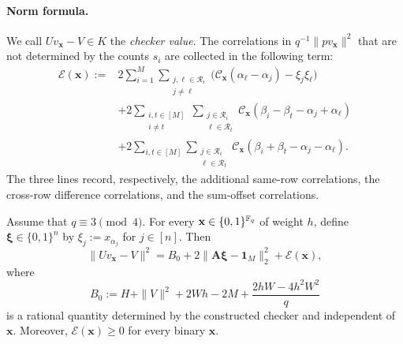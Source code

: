 \paragraph{Norm formula.}
We call $Uv_{\mathbf x}-V\in K$ the \emph{checker value}.  The
correlations in $q^{-1}\|pv_{\mathbf x}\|^2$ that are not determined by the
counts $s_i$ are collected in the following term:
\begin{equation}
\label{eq:checker-additional-correlations}
 \begin{aligned}
  \mathcal E(\mathbf x)
  :={}&
  2\sum_{i=1}^M
   \sum_{\substack{j,\ell\in\mathcal R_i\\j\ne\ell}}
  \bigl(
   \mathcal{C}_{\mathbf x}(\alpha_\ell-\alpha_j)-\xi_j\xi_\ell
  \bigr)
  \\
  &+2\sum_{\substack{i,t\in[M]\\i\ne t}}
   \sum_{\substack{j\in\mathcal R_i\\\ell\in\mathcal R_t}}
   \mathcal{C}_{\mathbf x}
   (\beta_i-\beta_t-\alpha_j+\alpha_\ell)
  \\
  &+2\sum_{i,t\in[M]}
   \sum_{\substack{j\in\mathcal R_i\\\ell\in\mathcal R_t}}
   \mathcal{C}_{\mathbf x}
   (\beta_i+\beta_t-\alpha_j-\alpha_\ell).
 \end{aligned}
\end{equation}
The three lines record, respectively, the additional same-row
correlations, the cross-row difference correlations, and the sum-offset
correlations.

\begin{theorem}
\label{thm:checker-score}
Assume that $q\equiv3\pmod4$.
For every $\mathbf x\in\{0,1\}^{\mathbb F_q}$ of weight $h$, define
$\boldsymbol\xi\in\{0,1\}^n$ by $\xi_j:=x_{\alpha_j}$ for $j\in[n]$.  Then
\begin{equation}
\label{eq:checker-score-exact}
 \|Uv_{\mathbf x}-V\|^2
 =B_0+2\|\mathbf A\boldsymbol\xi-\mathbf1_M\|_2^2
   +\mathcal E(\mathbf x),
\end{equation}
where
\begin{equation}
\label{eq:checker-baseline}
 B_0:=H+\|V\|^2+2Wh-2M
       +\frac{2hW-4h^2W^2}{q}
\end{equation}
is a rational quantity determined by the constructed checker and
independent of $\mathbf x$.  Moreover,
$\mathcal E(\mathbf x)\ge0$ for every binary $\mathbf x$.
\end{theorem}

